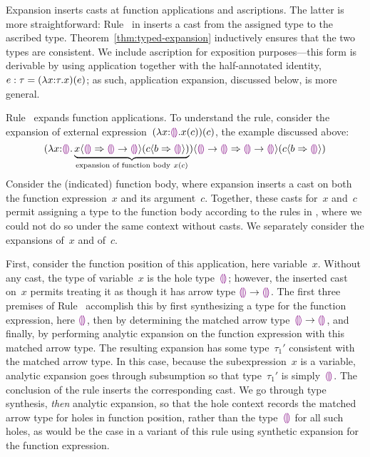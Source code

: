 Expansion inserts casts at function applications and ascriptions.
%
The latter is more straightforward: Rule~
in  inserts a cast from the assigned type to the
ascribed type.
%
Theorem~\ref{thm:typed-expansion} inductively ensures that the two
types are consistent.
%
We include ascription for exposition purposes---this form is derivable
by using application together with the half-annotated identity, $e
: \tau = (\lambda x{:}\tau.x)(e)$; as such, application
expansion, discussed below, is more general.

Rule~ expands function applications.
%
To understand the rule, consider the expansion of external
expression~$(\lambda x{:}\textcolor{violet}{\llparenthesis}\textcolor{violet}{\rrparenthesis}.x(c))(c)$, the example
discussed above:
\[
        \hap{\dcasttwo{
        (\halam{x}{\tehole}{\underbrace{
                \hap{\dcasttwo{x}{\tehole}{\tarr{\tehole}{\tehole}}}
                {\dcasttwo{c}{b}{\tehole}}
                }_{\textrm{expansion of function body}~x(c)}
        }
        )}{\tarr{\tehole}{\tehole}}{
           \tarr{\tehole}{\tehole}}
           }
           {\dcasttwo{c}{b}{\tehole}}
\]
Consider the (indicated) function body,
%
where expansion inserts a cast on both the function expression~$x$ and its argument~$c$.
%
Together, these casts for~$x$ and~$c$ permit assigning a type to the
function body according to the rules in , where we
could not do so under the same context without casts.
%
We separately consider the expansions of~$x$ and of~$c$.

First, consider the function position of this application, here variable~$x$.
%
Without any cast, the type of variable~$x$ is the hole type~$\textcolor{violet}{\llparenthesis}\textcolor{violet}{\rrparenthesis}$;
however, the inserted cast on~$x$ permits treating it as though it has
arrow type $\textcolor{violet}{\llparenthesis}\textcolor{violet}{\rrparenthesis} \rightarrow \textcolor{violet}{\llparenthesis}\textcolor{violet}{\rrparenthesis}$.
%
The first three premises of Rule~ accomplish this
%
by first synthesizing a type for the function expression, here
$\textcolor{violet}{\llparenthesis}\textcolor{violet}{\rrparenthesis}$, then
%
by determining the matched arrow type~$\textcolor{violet}{\llparenthesis}\textcolor{violet}{\rrparenthesis} \rightarrow \textcolor{violet}{\llparenthesis}\textcolor{violet}{\rrparenthesis}$, and
finally,
%
by performing analytic expansion on the function expression with this
matched arrow type.
%
The resulting expansion has some type~$\tau_1'$ consistent with the matched arrow type.
%
In this case, because the subexpression~$x$ is a variable, analytic
expansion goes through subsumption so that type~$\tau_1'$ is
simply~$\textcolor{violet}{\llparenthesis}\textcolor{violet}{\rrparenthesis}$.
%
The conclusion of the rule inserts the corresponding cast.
%
We go through type synthesis, \emph{then} analytic expansion, so that the hole
context records the matched arrow type for holes in function position,
rather than the type~$\textcolor{violet}{\llparenthesis}\textcolor{violet}{\rrparenthesis}$ for all such holes, as would be the case
in a variant of this rule using synthetic expansion for the function
expression.

